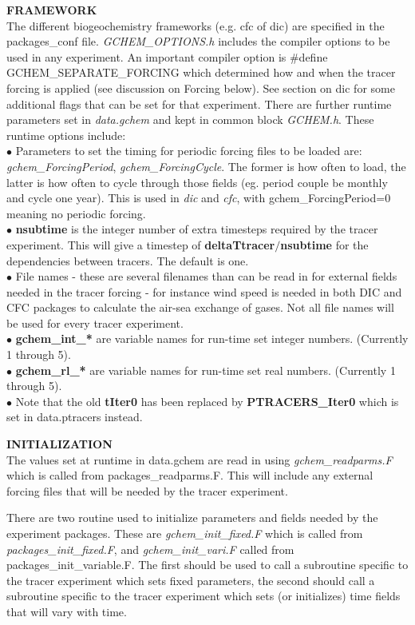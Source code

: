 \noindent
{{\bf FRAMEWORK}} \\
The different biogeochemistry frameworks (e.g. cfc of dic)
are specified in the packages\_conf file.
{\it GCHEM\_OPTIONS.h} includes the compiler options to be used
in any experiment. 
An important compiler option is
 \#define GCHEM\_SEPARATE\_FORCING which determined 
how and when the tracer forcing is applied (see discussion
on Forcing below). See section on dic for some additional
flags that can be set for that experiment.
 There are further runtime parameters
set in {\it data.gchem} and kept in common block {\it GCHEM.h}.
These runtime options include:\\
$\bullet$ Parameters to set the timing for periodic forcing files to
be loaded are: {\it gchem\_ForcingPeriod}, {\it gchem\_ForcingCycle}.
The former is how often to load, the latter is how often to cycle
through those fields (eg. period couple be monthly and cycle one year).
This is used in {\it dic} and {\it cfc}, with gchem\_ForcingPeriod=0
meaning no periodic forcing.
\\
$\bullet$ {\bf nsubtime} is the integer number of extra timesteps
 required by the tracer experiment. This will give a timestep
 of {\bf deltaTtracer}$/${\bf nsubtime} for the dependencies
 between tracers. The default is one.
\\
$\bullet$ File names - these are several filenames than can be read in
 for external fields needed in the tracer forcing - for instance
 wind speed is needed in both DIC and CFC packages to calculate
 the air-sea exchange of gases. Not all file names will be used 
 for every tracer experiment. 
\\
$\bullet$ {\bf gchem\_int\_*} are variable names for run-time set integer numbers. (Currently 1 through 5).
\\
$\bullet$ {\bf gchem\_rl\_*} are variable names for run-time set real numbers. (Currently 1 through 5).
\\
$\bullet$ Note that the old {\bf tIter0} has been replaced by {\bf PTRACERS\_Iter0} which is
set in data.ptracers instead.

\vspace{.5cm}

\noindent
{{\bf INITIALIZATION}}\\
The values set at runtime in data.gchem are read in
using {\it gchem\_readparms.F} which is called from
packages\_readparms.F. This will include any external
forcing files that will be needed by the tracer experiment.

There are two routine used to initialize parameters and fields
needed by the experiment packages. These are
{\it gchem\_init\_fixed.F} which is called from \textit{packages\_init\_fixed.F}, and
{\it gchem\_init\_vari.F} called from 
packages\_init\_variable.F. The first should
be used to call a subroutine specific to the tracer experiment
which sets fixed parameters, the second should call a subroutine
specific to the tracer experiment
which sets (or initializes) time fields that will vary with time.

